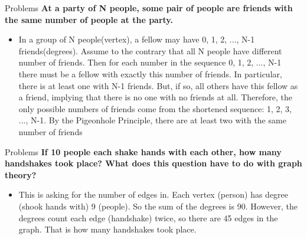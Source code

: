 \documentclass{beamer}
\begin{document}
\begin{frame}{Problems}
	\textbf{At a party of N people, some pair of people are friends with the same number of people at the party.}
	\begin{itemize}
		\item  In a group of N people(vertex), a fellow may have 0, 1, 2, ..., N-1 friends(degrees). Assume to the contrary that all N people have different number of friends. Then for each number in the sequence 0, 1, 2, ..., N-1 there must be a fellow with exactly this number of friends. In particular, there is at least one with N-1 friends. But, if so, all others have this fellow as a friend, implying that there is no one with no friends at all. Therefore, the only possible numbers of friends come from the shortened sequence: 1, 2, 3, ..., N-1. By the Pigeonhole Principle, there are at least two with the same number of friends
	\end{itemize}
\end{frame}
\begin{frame}{Problems}
	\textbf{If 10 people each shake hands with each other, how many handshakes took place? What does this question have to do with graph theory?}
	\begin{itemize}
		\item  This is asking for the number of edges in.  Each vertex (person) has degree (shook hands with) 9 (people). So the sum of the degrees is  90.  However, the degrees count each edge (handshake) twice, so there are 45 edges in the graph. That is how many handshakes took place.
	\end{itemize}
\end{frame}
\end{document}

